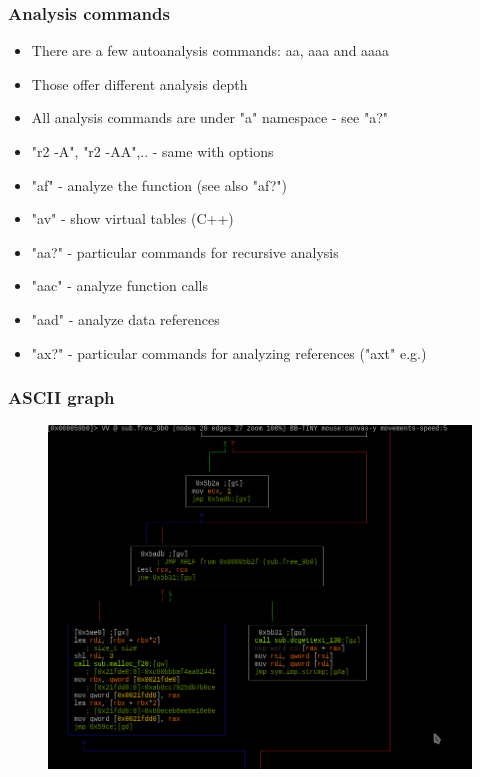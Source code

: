 \documentclass[10pt,pdf,utf8,english,compress,hyperref={unicode}]{beamer}
\begin{document}
\begin{frame}[fragile]
  \frametitle{Analysis commands}
  \begin{itemize}
	  \item There are a few autoanalysis commands: aa, aaa and aaaa
	  \item Those offer different analysis depth
	  \item All analysis commands are under "a" namespace - see "a?"
	  \item "r2 -A", "r2 -AA",.. - same with options
	  \item "af" - analyze the function (see also "af?")
	  \item "av" - show virtual tables (C++)
	  \item "aa?" - particular commands for recursive analysis
	  \item "aac" - analyze function calls
	  \item "aad" - analyze data references
	  \item "ax?" - particular commands for analyzing references ("axt" e.g.)
  \end{itemize}
\end{frame}

\begin{frame}[fragile]
	\frametitle{ASCII graph}
	\begin{figure}
		\includegraphics[width=\linewidth]{r2asciigraph.png}
	\end{figure}
\end{frame}
\end{document}
